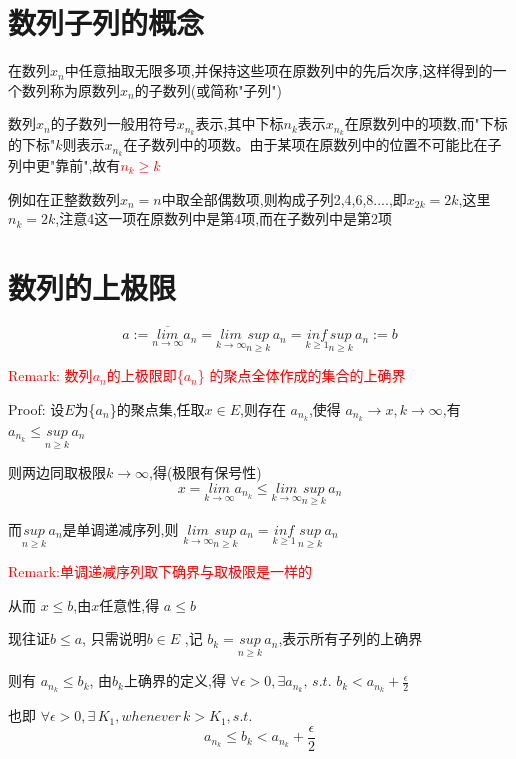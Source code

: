\documentclass{article}
\begin{document}
 

\section{数列子列的概念}

在数列$x_n$中任意抽取无限多项,并保持这些项在原数列中的先后次序,这样得到的一个数列称为原数列$x_n$的子数列(或简称"子列")

数列$x_n$的子数列一般用符号$x_{n_k}$表示,其中下标$n_k$表示$x_{n_k}$在原数列中的项数,而"下标的下标"$k$则表示$x_{n_k}$在子数列中的项数。由于某项在原数列中的位置不可能比在子列中更"靠前",故有\textbf{\textcolor{red}{$n_k\ge k$}}

例如在正整数数列$x_n=n$中取全部偶数项,则构成子列2,4,6,8....,即$x_{2k}=2k$,这里$n_k = 2k$,注意4这一项在原数列中是第4项,而在子数列中是第2项

\section{数列的上极限}

$$
a:= \overline{\underset{n \to \infty}{lim}}a_n= \underset{k \to \infty}{lim}\underset{n \ge k}{sup} \,a_n = \underset{k \ge 1}{inf} \underset{n \ge k}{sup } \,a_n := b
$$

\textcolor{red}{Remark: 数列$a_n$的上极限即\{$a_n$\} 的聚点全体作成的集合的上确界}


Proof: 设$E$为\{$a_n$\}的聚点集,任取$x \in E$,则存在 $a_{n_k}$,使得 $a_{n_k} \to x, k \to \infty$,有 $a_{n_k}\le \underset{n \ge k}{sup} \, a_n$

则两边同取极限$k \to \infty$,得(极限有保号性)
$$ x = \underset{k \to \infty}{lim}a_{n_k} \leq \underset{k \to \infty}{lim}\underset{n \ge k}{sup} \, a_n $$ 

而$\underset{n \ge k}{sup} \, a_n$是单调递减序列,则
$\underset{k \to \infty}{lim}\underset{n \ge k}{sup} \, a_n = \underset{k \ge 1}{inf} \, \underset{n \ge k}{sup} \, a_n
$

\textcolor{red}{Remark:单调递减序列取下确界与取极限是一样的} 


从而 $ x \le b$,由$x$任意性,得 $ a \le b$ 


现往证$ b \le a$, 只需说明$ b \in E$ ,记 $b_k = \underset{n \ge k}{sup}\, a_n $,表示所有子列的上确界


则有 $a_{n_k}\le b_k $, 由$b_k $上确界的定义,得
$\forall \epsilon > 0, \exists a_{n_k}, \, s.t.$
$ b_k < a_{n_k} + \frac{\epsilon}{2}$

也即
$\forall \epsilon > 0, \exists \, K_1, whenever \, k > K_1 , s.t.$
$$a_{n_k} \le b_k < a_{n_k} + \frac{\epsilon}{2}  $$
\end{document}

